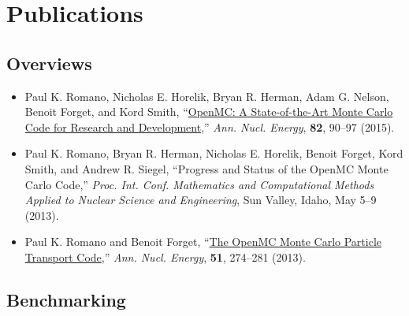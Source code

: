 \section{Publications}
\label{publications}

\subsection{Overviews}

\begin{itemize}
\item Paul K. Romano, Nicholas E. Horelik, Bryan R. Herman, Adam G. Nelson, Benoit
Forget, and Kord Smith, ``\href{https://doi.org/10.1016/j.anucene.2014.07.048}{OpenMC: A State-of-the-Art Monte Carlo Code for Research and Development},''
\textit{Ann. Nucl. Energy}, \textbf{82}, 90--97 (2015).

\item Paul K. Romano, Bryan R. Herman, Nicholas E. Horelik, Benoit Forget, Kord
Smith, and Andrew R. Siegel, ``Progress and Status of the OpenMC Monte Carlo
Code,'' \textit{Proc. Int. Conf. Mathematics and Computational Methods Applied to
Nuclear Science and Engineering}, Sun Valley, Idaho, May 5--9 (2013).

\item Paul K. Romano and Benoit Forget, ``\href{https://doi.org/10.1016/j.anucene.2012.06.040}{The OpenMC Monte Carlo Particle Transport Code},''
\textit{Ann. Nucl. Energy}, \textbf{51}, 274--281 (2013).
\end{itemize}

\subsection{Benchmarking}

